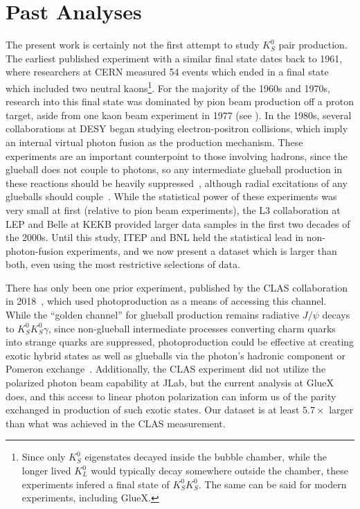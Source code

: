 \section{Past Analyses}
The present work is certainly not the first attempt to study $K_S^0$ pair production. The earliest published experiment with a similar final state dates back to 1961, where researchers at CERN measured 54 events which ended in a final state which included two neutral kaons\footnote{Since only $K_S^0$ eigenstates decayed inside the bubble chamber, while the longer lived $K_L^0$ would typically decay somewhere outside the chamber, these experiments infered a final state of $K_S^0K_S^0$. The same can be said for modern experiments, including GlueX.}. For the majority of the 1960s and 1970s, research into this final state was dominated by pion beam production off a proton target, aside from one kaon beam experiment in 1977 (see ). In the 1980s, several collaborations at DESY began studying electron-positron collisions, which imply an internal virtual photon fusion as the production mechanism. These experiments are an important counterpoint to those involving hadrons, since the glueball does not couple to photons, so any intermediate glueball production in these reactions should be heavily suppressed~\cite{Acciarri2001}, although radial excitations of any glueballs should couple~\cite{Mathieu2009}. While the statistical power of these experiments was very small at first (relative to pion beam experiments), the L3 collaboration at LEP and Belle at KEKB provided larger data samples in the first two decades of the 2000s. Until this study, ITEP and BNL held the statistical lead in non-photon-fusion experiments, and we now present a dataset which is larger than both, even using the most restrictive selections of data.

There has only been one prior experiment, published by the CLAS collaboration in 2018~\cite{Chandavar2018}, which used photoproduction as a means of accessing this channel. While the ``golden channel'' for glueball production remains radiative $J/\psi$ decays to $K_S^0K_S^0\gamma$, since non-glueball intermediate processes converting charm quarks into strange quarks are suppressed, photoproduction could be effective at creating exotic hybrid states as well as glueballs via the photon's hadronic component or Pomeron exchange~\cite{Mathieu2009}. Additionally, the CLAS experiment did not utilize the polarized photon beam capability at JLab, but the current analysis at GlueX does, and this access to linear photon polarization can inform us of the parity exchanged in production of such exotic states. Our dataset is at least $5.7\times$ larger than what was achieved in the CLAS measurement.

